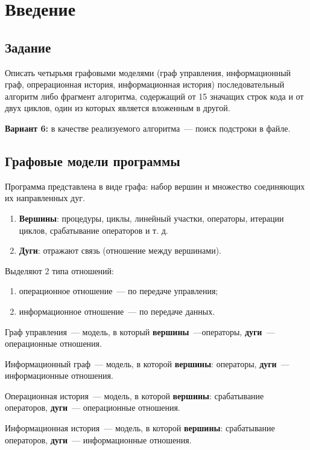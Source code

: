 \chapter{Введение}
\section{Задание}

Описать четырьмя графовыми моделями (граф управления, информационный граф, опрерационная история, информационная история) последовательный алгоритм либо фрагмент алгоритма, содержащий от 15 значащих строк кода и от двух циклов, один из которых является вложенным в другой.

\textbf{Вариант 6:} в качестве реализуемого алгоритма~--- поиск подстроки в файле.

\section{Графовые модели программы}

Программа представлена в виде графа: набор вершин и множество соединяющих их направленных дуг.

\begin{enumerate}
	\item \textbf{Вершины}: процедуры, циклы, линейный участки, операторы, итерации циклов, срабатывание операторов и т. д.
	\item \textbf{Дуги}: отражают связь (отношение между вершинами). 
\end{enumerate}

Выделяют 2 типа отношений:
\begin{enumerate}
	\item операционное отношение~--- по передаче управления;
	\item информационное отношение~--- по передаче данных.
\end{enumerate}

Граф управления~--- модель, в который \textbf{вершины}~---операторы, \textbf{дуги}~--- операционные отношения.

Информационный граф~--- модель, в которой \textbf{вершины}: операторы, \textbf{дуги}~--- информационные отношения.

Операционная история~--- модель, в которой \textbf{вершины}: срабатывание операторов, \textbf{дуги}~--- операционные отношения.

Информационная история~--- модель, в которой \textbf{вершины}: срабатывание операторов, \textbf{дуги}~--- информационные отношения.